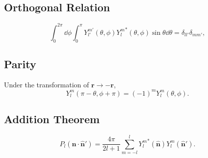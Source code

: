 \documentclass{article}
\theoremstyle{1}
\theoremstyle{2}
\begin{document}
\subsection{Orthogonal Relation}
\begin{equation}
    \int_{0}^{2\pi}\dd{\phi}\int_{0}^{\pi}Y_{l'}^{m'}\left(\theta,\phi\right){Y^m_l}^*\left(\theta,\phi\right)\sin\theta\dd{\theta}=\delta_{ll'}\delta_{mm'},
\end{equation}
\subsection{Parity}
Under the transformation of $\mathbf{r}\rightarrow -\mathbf{r}$, 
\begin{equation}
    Y_l^m\left(\pi-\theta,\phi+\pi\right)=\left(-1\right)^mY_l^m\left(\theta,\phi\right).
\end{equation}
\subsection{Addition Theorem}
\begin{equation}
    P_l\left(\hat{\mathbf{n}}\cdot\hat{\mathbf{n}}'\right)=\frac{4\pi}{2l+1}\sum_{m=-l}^{l}{Y_l^m}^*\left(\hat{\mathbf{n}}\right)Y_l^m\left(\hat{\mathbf{n}}'\right).
\end{equation}
\end{document}
